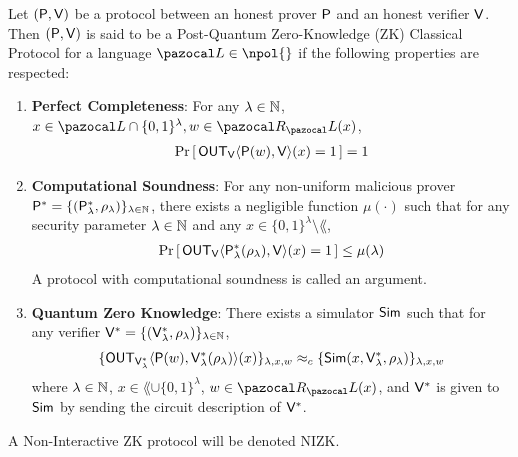 \begin{definition}\label{def:postquantumZK}
  Let $(\P{},\V{})$ be a protocol between an honest \PPT{} prover $\P{}$ and an honest \PPT{} verifier $\V{}$. Then $(\P{},\V{})$ is said to be a Post-Quantum Zero-Knowledge (ZK) Classical Protocol for a language $\lang \in \npol{}$ if the following properties are respected:
  \begin{enumerate}
    \item \textbf{Perfect Completeness}: For any $\lambda \in \N$, $x \in \lang \cap \{0,1\}^\lambda, w \in \cR_\lang(x)$,
          \begin{align}
            \pr{\OUT_\V{}\langle \P{}(w), \V{}\rangle(x) = 1} = 1
          \end{align}
    \item {}\arxivOnlyNoDiff{
          \begin{itemize}
            \item }\textbf{Computational Soundness}: For any non-uniform \QPT{} malicious prover $\P{}^* = \{(\P{}^*_\lambda, \rho_\lambda)\}_{\lambda \in \N}$, there exists a negligible function $\mu(\cdot)$ such that for any security parameter $\lambda \in \N$ and any $x \in \{0,1\}^\lambda \setminus \lang$,
                  \begin{align}
                    \pr{\OUT_\V{}\langle \P{}^*_\lambda(\rho_\lambda), \V{}\rangle(x)=1}\leq \mu(\lambda)
                  \end{align}
                  A protocol with computational soundness is called an argument.
          \arxivOnlyNoDiff{\end{itemize}}
    \item \textbf{Quantum Zero Knowledge}: There exists a \QPT{} simulator $\Sim$ such that for any \QPT{} verifier $\V{}^* = \{(\V{}^*_\lambda,\rho_\lambda)\}_{\lambda \in \N}$,
          \begin{align}
            \{\OUT_{\V{}^*_\lambda}\langle \P{}(w), \V{}^*_\lambda(\rho_\lambda)\rangle(x)\}_{\lambda,x,w} \approx_c \{\Sim(x,\V{}^*_\lambda,\rho_\lambda)\}_{\lambda,x,w}
          \end{align}
          where $\lambda \in \N$, $x \in \lang \cup \{0,1\}^\lambda$, $w \in \cR_\lang(x)$, and $\V{}^*$ is given to $\Sim$ by sending the circuit description of $\V{}^*$.
  \end{enumerate}
  A Non-Interactive ZK protocol will be denoted NIZK.
\end{definition}


